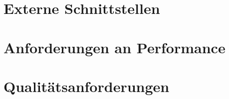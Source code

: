 \documentclass[a4paper]{book}
\begin{document}
\section{Externe Schnittstellen}
\blindtext

\section{Anforderungen an Performance}
\blindtext

\section{Qualitätsanforderungen}
\blindtext
\end{document}

